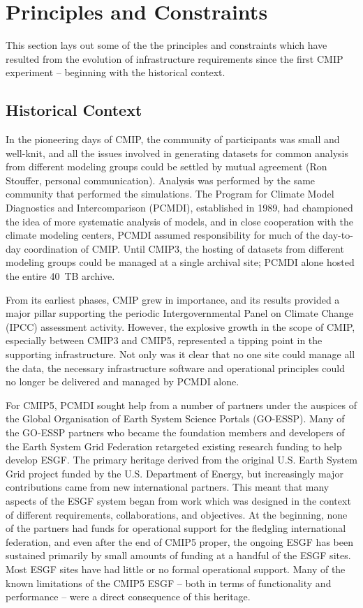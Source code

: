 \documentclass[gmd,manuscript]{copernicus}
\begin{document}
\section{Principles and Constraints}
\label{sec:principles}

This section lays out some of the the principles and constraints which
have resulted from the evolution of infrastructure requirements since
the first CMIP experiment -- beginning with the historical context.

\subsection{Historical Context}
\label{sec:history}

In the pioneering days of CMIP, the community of participants was
small and well-knit, and all the issues involved in generating
datasets for common analysis from different modeling groups could be
settled by mutual agreement (Ron Stouffer, personal communication).
Analysis was performed by the same community that performed the
simulations. The Program for Climate Model Diagnostics and
Intercomparison (PCMDI), established in 1989, had championed the idea
of more systematic analysis of models, and in close cooperation with
the climate modeling centers, PCMDI assumed responsibility for much of
the day-to-day coordination of CMIP. Until CMIP3, the hosting of
datasets from different modeling groups could be managed at a single
archival site; PCMDI alone hosted the entire 40~TB archive.

From its earliest phases, CMIP grew in importance, and its results
provided a major pillar supporting the periodic Intergovernmental
Panel on Climate Change (IPCC) assessment activity. However, the
explosive growth in the scope of CMIP, especially between CMIP3 and
CMIP5, represented a tipping point in the supporting infrastructure.
Not only was it clear that no one site could manage all the data, the
necessary infrastructure software and operational principles could no
longer be delivered and managed by PCMDI alone.

For CMIP5, PCMDI sought help from a number of partners under the
auspices of the Global Organisation of Earth System Science Portals
(GO-ESSP). Many of the GO-ESSP partners who became the foundation
members and developers of the Earth System Grid Federation retargeted
existing research funding to help develop ESGF. The primary heritage derived from
the original U.S. Earth System Grid project funded by
the U.S. Department of Energy, but increasingly major contributions 
came from new international partners. This meant that many
aspects of the ESGF system began from work which was designed in the
context of different requirements, collaborations, and objectives. At
the beginning, none of the partners had funds for operational support
for the fledgling international federation, and even after the end of
CMIP5 proper, the ongoing ESGF has been sustained primarily by small
amounts of funding at a handful of the ESGF sites. Most ESGF sites
have had little or no formal operational support. Many of the known
limitations of the CMIP5 ESGF -- both in terms of functionality and
performance -- were a direct consequence of this heritage.
\end{document}
